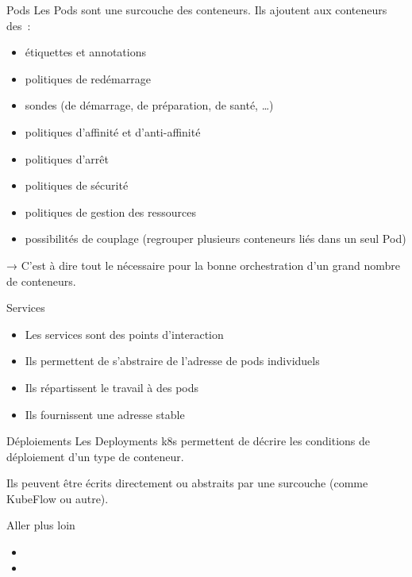 \begin{frame}{Pods}
  Les Pods sont une surcouche des conteneurs. Ils ajoutent aux conteneurs des~:
  \begin{itemize}
    \item étiquettes et annotations
    \item politiques de redémarrage
    \item sondes (de démarrage, de préparation, de santé, …)
    \item politiques d'affinité et d'anti-affinité
    \item politiques d'arrêt
    \item politiques de sécurité
    \item politiques de gestion des ressources
    \item possibilités de couplage (regrouper plusieurs conteneurs liés dans un seul Pod)
  \end{itemize}

  → C'est à dire tout le nécessaire pour la bonne orchestration d'un grand nombre de conteneurs.
\end{frame}

\begin{frame}{Services}
  \begin{itemize}
    \item Les services sont des points d'interaction
    \item Ils permettent de s'abstraire de l'adresse de pods individuels
    \item Ils répartissent le travail à des pods
    \item Ils fournissent une adresse stable
  \end{itemize}
\end{frame}

\begin{frame}{Déploiements}
  Les Deployments k8s permettent de décrire les conditions de déploiement d'un type de conteneur.

  Ils peuvent être écrits directement ou abstraits par une surcouche (comme KubeFlow ou autre).
\end{frame}

\begin{frame}{Aller plus loin}
  \begin{itemize}
    \item {}
    \item {}
  \end{itemize}
\end{frame}

